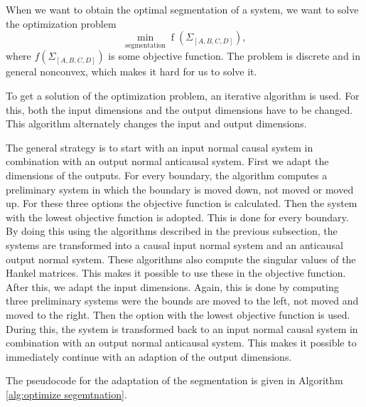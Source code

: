 \documentclass[doctype=mastersthesis,BCOR=15mm,biblatex]{ldvbook}%
\DeclareMathOperator{\f}{f}
\begin{document}
When we want to obtain the optimal segmentation of a system, 
we want to solve the optimization problem
\begin{equation}
\underset{\text{segmentation}}{\min} \f(\Sigma_{[A,B,C,D]})
,
\end{equation}
where $f(\Sigma_{[A,B,C,D]})$ is some objective function.
The problem is discrete and in general nonconvex, which makes it hard for us to solve it.

To get a solution of the optimization problem, an iterative algorithm is used.
For this, both the input dimensions and the output dimensions have to be changed.
This algorithm alternately changes the input and output dimensions.

The general strategy is to start with an input normal causal system in combination with an output normal anticausal system.
First we adapt the dimensions of the outputs.
For every boundary, the algorithm computes a preliminary system in which the boundary is moved down, not moved or moved up.
For these three options the objective function is calculated. 
Then the system with the lowest objective function is adopted.
This is done for every boundary.
By doing this using the algorithms described in the previous subsection, the systems are transformed into a causal input normal system and an anticausal output normal system.
These algorithms also compute the singular values of the Hankel matrices. This makes it possible to use these in the objective function.
After this, we adapt the input dimensions.
Again, this is done by computing three preliminary systems were the 
  bounds are moved to the left, not moved and moved to the right.
Then the option with the lowest objective function is used.
During this, the system is transformed back to an input normal causal system in combination with an output normal anticausal system.
This makes it possible to immediately continue with an adaption of the output dimensions.

The pseudocode for the adaptation of the segmentation is given in Algorithm\,\ref{alg:optimize segemtnation}.
\end{document}

